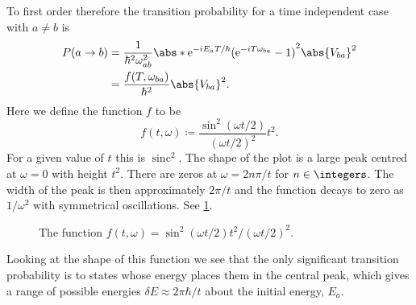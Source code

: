 \documentclass[fleqn]{NotesClass}
\newcommand*{\e}{\mathrm{e}}
\DeclareMathOperator{\sinc}{sinc}
\begin{document}
    To first order therefore the transition probability for a time independent case with \(a \ne b\) is
    \begin{align}
        P(a \to b) &= \frac{1}{\hbar^2\omega_{ab}^2}\abs*{\e^{-iE_aT/\hbar}(\e^{-iT\omega_{ba}} - 1)}^2\abs{V_{ba}}^2\\
        &= \frac{f(T, \omega_{ba})}{\hbar^2}\abs{V_{ba}}^2.
    \end{align}
    Here we define the function \(f\) to be
    \begin{equation}
        f(t, \omega) \coloneqq \frac{\sin^2(\omega t/2)}{(\omega t/2)^2}t^2.
    \end{equation}
    For a given value of \(t\) this is \(\sinc^2\).
    The shape of the plot is a large peak centred at \(\omega = 0\) with height \(t^2\).
    There are zeros at \(\omega = 2n\pi/t\) for \(n \in \integers\).
    The width of the peak is then approximately \(2\pi/t\) and the function decays to zero as \(1/\omega^2\) with symmetrical oscillations.
    See \cref{fig:sinc squared}.
    
    \begin{figure}
        \caption{The function \(f(t, \omega) = \sin^2(\omega t/2)t^2/(\omega t/2)^2\).}
        \label{fig:sinc squared}
    \end{figure}
    
    Looking at the shape of this function we see that the only significant transition probability is to states whose energy places them in the central peak, which gives a range of possible energies \(\delta E \approx 2\pi\hbar/t\) about the initial energy, \(E_a\).
    
\end{document}
